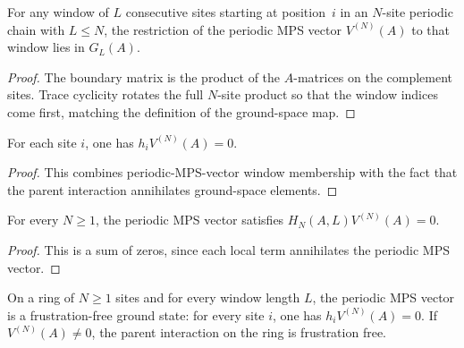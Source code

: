 \begin{lemma}\label{lem:mpv_window_mem_ground_space}
    \leanok
    For any window of $L$ consecutive sites starting at position~$i$ in an
    $N$-site periodic chain with $L\le N$, the restriction of the periodic MPS
    vector $V^{(N)}(A)$ to that window lies in $G_L(A)$.
\end{lemma}

\begin{proof}
    \leanok
    The boundary matrix is the product of the $A$-matrices on the complement
    sites. Trace cyclicity rotates the full $N$-site product so that the window
    indices come first, matching the definition of the ground-space map.
\end{proof}

\begin{lemma}\label{lem:local_term_annihilates_mpv}
    \leanok
    For each site $i$, one has $h_iV^{(N)}(A)=0$.
\end{lemma}

\begin{proof}
    \leanok
    This combines periodic-MPS-vector window membership with the fact that the
    parent interaction annihilates ground-space elements.
\end{proof}

\begin{lemma}\label{lem:parent_hamiltonian_annihilates}
    \leanok
    For every $N\ge1$, the periodic MPS vector satisfies
    $H_N(A,L)V^{(N)}(A)=0$.
\end{lemma}

\begin{proof}
    \leanok
    This is a sum of zeros, since each local term annihilates the periodic MPS
    vector.
\end{proof}

\begin{lemma}\label{lem:parent_hamiltonian_ff}
    \leanok
    On a ring of $N\ge1$ sites and for every window length $L$, the periodic
    MPS vector is a frustration-free ground state: for every site $i$, one has
    $h_iV^{(N)}(A)=0$. If $V^{(N)}(A)\ne0$, the parent interaction on the ring
    is frustration free.
\end{lemma}

